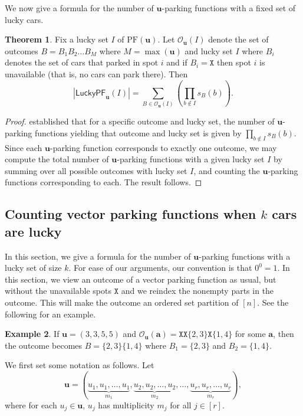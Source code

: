 \documentclass[reqno]{amsart}
\newcommand{\X}{\texttt{X}}
\newcommand{\LPF}{\mathsf{LuckyPF}}
\newcommand{\PF}{\mathrm{PF}}
\theoremstyle{definition}
\newtheorem{theorem}{Theorem}[section]
\newtheorem{example}[theorem]{Example}
\theoremstyle{remark}
\newcommand{\out}{\mathcal{O}}
\newcommand{\bsy}{\boldsymbol}
\begin{document}
We now give a formula for the number of $\bsy{u}$-parking functions with a fixed set of lucky cars.

\begin{theorem}
Fix a lucky set $I$ of $\PF(\bsy{u})$. Let $\out_{\bsy{u}}(I)$ denote the set of outcomes $B=B_1B_2\ldots B_M$ where $M=\max(\bsy{u})$ and lucky set $I$ where $B_i$ denotes the set of cars that parked in spot $i$ and if $B_i=\X$ then spot $i$ is unavailable (that is, no cars can park there). 
Then
\[|\LPF_{\bsy{u}}(I)|=\sum_{B\in \out_{\bsy{u}}(I)} \left( \prod_{b\notin I}s_B(b)\right).\]
\end{theorem}



\begin{proof}
 established that for a specific outcome and lucky set, the number of $\bsy{u}$-parking functions yielding that outcome and lucky set is given by $\prod_{b\notin I}s_B(b)$. Since each $\bsy{u}$-parking function corresponds to exactly one outcome, we may compute the total number of $\bsy{u}$-parking functions with a given lucky set $I$ by summing over all possible outcomes with lucky set $I$, and counting the $\bsy{u}$-parking functions corresponding to each. The result follows.      
\end{proof}


\subsection{Counting vector parking functions when $k$ cars are lucky}
In this section, we give a formula for the number of $\bsy{u}$-parking functions with a lucky set of size $k$. {For ease of our arguments, our convention is that $0^0=1$}. 
In this section, we view an outcome of a vector parking function as usual, but without the unavailable spots $\X$ and we reindex the nonempty parts in the outcome. This will make the outcome an ordered set partition of $[n]$. See the following for an example.

\begin{example}\label{ex: dropping the unavailable spots}
If $\bsy{u}=(3,3,5,5)$ and $\out_{\bsy{u}}(\bsy{a})=\X\X\{2,3\}\X\{1,4\}$ for some $\bsy{a}$, then the outcome becomes $B=\{2,3\}\{1,4\}$ where $B_1=\{2,3\}$ and $B_2=\{1,4\}$.
\end{example}



\noindent We first set some notation as follows. Let 
\[\bsy{u}=(\underbrace{u_1,u_1,\ldots, u_1}_{m_1}, \underbrace{u_2,u_2,\ldots, u_2}_{m_2}, \ldots, \underbrace{u_r,u_r,\ldots ,u_r}_{m_r}),\]
where for each $u_j\in \bsy{u}$, $u_j$ has multiplicity $m_j$ for all $j\in [r]$.
\end{document}
